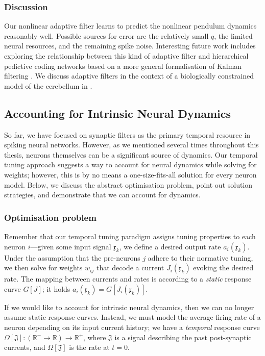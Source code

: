 \subsubsection{Discussion}

Our nonlinear adaptive filter learns to predict the nonlinear pendulum dynamics reasonably well.
Possible sources for error are the relatively small $q$, the limited neural resources, and the remaining spike noise.
Interesting future work includes exploring the relationship between this kind of adaptive filter and hierarchical pedictive coding networks based on a more general formalisation of Kalman filtering \citep{bastos2012canonical}.
We discuss adaptive filters in the context of a biologically constrained model of the cerebellum in .

\clearpage

\subsection{Accounting for Intrinsic Neural Dynamics}
\label{sec:temporal_tuning_neural_dynamics}

So far, we have focused on synaptic filters as the primary temporal resource in spiking neural networks.
However, as we mentioned several times throughout this thesis, neurons themselves can be a significant source of dynamics.
Our temporal tuning approach suggests a way to account for neural dynamics while solving for weights; however, this is by no means a one-size-fits-all solution for every neuron model.
Below, we discuss the abstract optimisation problem, point out solution strategies, and demonstrate that we can account for \ALIF dynamics.

\subsubsection{Optimisation problem}
Remember that our temporal tuning paradigm assigns tuning properties to each neuron $i$---given some input signal $\mathfrak{x}_k$, we define a desired output rate $a_i(\mathfrak{x}_k)$.
Under the assumption that the pre-neurons $j$ adhere to their normative tuning, we then solve for weights $w_{ij}$ that decode a current $J_i(\mathfrak{x}_k)$ evoking the desired rate.
The mapping between currents and rates is according to a \emph{static} response curve $G[J]$; it holds $a_i(\mathfrak{x}_k) = G[J_i(\mathfrak{x}_k)]$.

If we would like to account for intrinsic neural dynamics, then we can no longer assume static response curves.
Instead, we must model the average firing rate of a neuron depending on its input current history; we have a \emph{temporal} response curve $\Omega[\mathfrak{J}] : (\mathbb{R}^- \longrightarrow \mathbb{R}) \longrightarrow \mathbb{R}^+$, where $\mathfrak{J}$ is a signal describing the past post-synaptic currents, and $\Omega[\mathfrak{J}]$ is the rate at $t = 0$.

